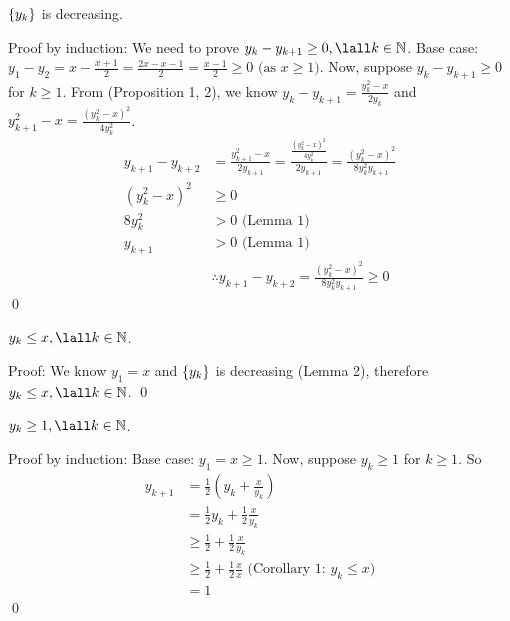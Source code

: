 \documentclass[10pt, letterpaper, titlepage]{article}
\begin{document}
        \begin{lemma}
          $\{ y_k \}$ is decreasing.
        \end{lemma}
          Proof by induction: 
          We need to prove $y_k - y_{k+1} \geq 0, \lall k \in \N$.
          Base case: 
          \(
              y_1 - y_{2} 
              = x - \frac{x + 1}{2} 
              = \frac{2x - x - 1}{2} 
              = \frac{x-1}{2}
              \geq 0 \text{ (as $x \geq 1$)} 
          \).
          Now, suppose $y_k - y_{k+1} \geq 0$ for $k \geq 1$.
          From (Proposition 1, 2), we know $y_k - y_{k+1} = \frac{y_k^2 -x}{2y_k}$
          and $y_{k+1}^2 - x = \frac{(y_k^2 - x)^2}{4y_k^2}$.
          \begin{align*}
            y_{k+1} - y_{k+2} 
            &= \frac{y_{k+1}^2 - x}{2y_{k+1}} 
            = \frac{\frac{(y_k^2 - x)^2}{4y_k^2}}{2y_{k+1}} 
            = \frac{(y_k^2 - x)^2}{8y_k^2y_{k+1}} \\
            (y_k^2 - x)^2 &\geq 0 \\
            8y_k^2 &> 0 \text{ (Lemma 1)} \\
            y_{k+1} &> 0 \text{ (Lemma 1)} \\
            &\therefore y_{k+1} - y_{k+2} 
            = \frac{(y_k^2 - x)^2}{8y_k^2y_{k+1}} 
            \geq 0 
          \end{align*}
          \qed

        \begin{corollary}
          $y_k \leq x, \lall k \in \N$.
        \end{corollary}
          Proof: 
          We know $y_1 = x$ and $\{ y_k \}$ is decreasing (Lemma 2),
          therefore $y_k \leq x, \lall k \in\N$.
          \qed

          \begin{proposition}
            $y_k \geq 1, \lall k \in \N$.
          \end{proposition}
          Proof by induction:
          Base case: $y_1 = x \geq 1$. 
          Now, suppose $y_k \geq 1$ for $k \geq 1$.
          So
          \begin{align*}
            y_{k+1} &= \frac{1}{2} (y_k + \frac{x}{y_k})\\
            &= \frac{1}{2}y_k + \frac{1}{2}\frac{x}{y_k}\\
            &\geq \frac{1}{2} + \frac{1}{2}\frac{x}{y_k}\\
            &\geq \frac{1}{2} + \frac{1}{2}\frac{x}{x} \text{ (Corollary 1: $y_k \leq x$)}\\
            &= 1 
          \end{align*}
          \qed
\end{document}
